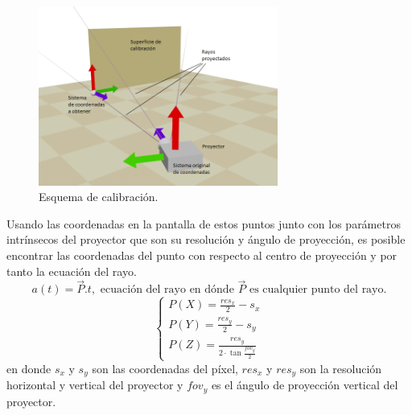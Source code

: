 \begin{figure}[H]
  \centering
    \includegraphics[width=0.7\textwidth]{./Cap2_videomapping/CalibrationSketch}
  \caption[Imagen propia.]{Esquema de calibración.}
  \label{fig:CalibrationSketch}
\end{figure}

Usando las coordenadas en la pantalla de estos puntos junto con los parámetros intrínsecos del proyector que son su resolución y ángulo de proyección, es posible encontrar las coordenadas del punto con respecto al centro de proyección y por tanto la ecuación del rayo.
\[
a(t) = \vec{P} . t,	\mbox{ ecuación del rayo en dónde } \vec{P} \mbox{ es cualquier punto del rayo.}
\]
\[
\begin{cases}
P(X) = \frac{res_x}{2} - s_x \\
P(Y) = \frac{res_y}{2} - s_y \\
P(Z) = \frac{res_y}{2 \cdot \tan \frac{fov_y}{2}}
\end{cases}
\]
en donde $s_x$ y $s_y$ son las coordenadas del píxel, $res_x$ y $res_y$ son la resolución horizontal y vertical del proyector y $fov_y$ es el ángulo de proyección vertical del proyector.

